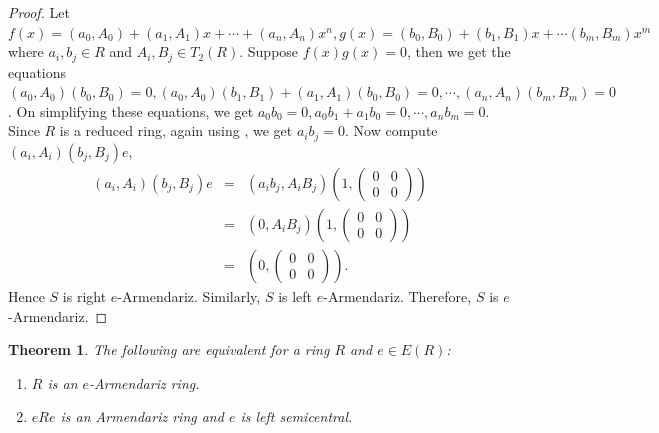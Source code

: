 \documentclass[10pt,a4paper]{amsart}
\newtheorem{theorem}{Theorem}[section]
\numberwithin{equation}{section}
\begin{document}
\begin{proof}
	Let $f(x)=(a_0,A_0)+(a_1,A_1)x+\cdots+(a_n,A_n)x^n,g(x)=(b_0,B_0)+(b_1,B_1)x+\cdots(b_m,B_m)x^m$ where $a_i,b_j\in R$ and $A_i,B_j\in T_2(R)$. Suppose $f(x)g(x)=0$, then we get the equations $(a_0,A_0)(b_0,B_0)=0, (a_0,A_0)(b_1,B_1)+(a_1,A_1)(b_0,B_0)=0,\cdots,(a_n,A_n)(b_m,B_m)=0$. On simplifying these equations, we get $a_0b_0=0,a_0b_1+a_1b_0=0,\cdots,a_nb_m=0$. Since $R$ is a reduced ring, again using \cite[Lemma 1]{Armendariz}, we get $a_ib_j=0$. Now compute $(a_i,A_i)(b_j,B_j)e$,
	\begin{eqnarray*}
		(a_i,A_i)(b_j,B_j)e&=&(a_ib_j,A_iB_j)\left(1,\begin{pmatrix}
			0&0\\0&0
		\end{pmatrix}\right)\\
		&=&(0,A_iB_j)\left(1,\begin{pmatrix}
			0&0\\0&0
		\end{pmatrix}\right)\\
		&=&\left(0,\begin{pmatrix}
			0&0\\0&0
		\end{pmatrix}\right).
	\end{eqnarray*}
	Hence $S$ is right $e$-Armendariz. Similarly, $S$ is left $e$-Armendariz. Therefore, $S$ is $e$-Armendariz.
\end{proof}

\begin{theorem}
	The following are equivalent for a ring $R$ and $e\in E(R)$:
	\begin{enumerate}
		\item $R$ is an $e$-Armendariz ring.
		\item $eRe$ is an Armendariz ring and $e$ is left semicentral.
	\end{enumerate}
\end{theorem}
\end{document}
